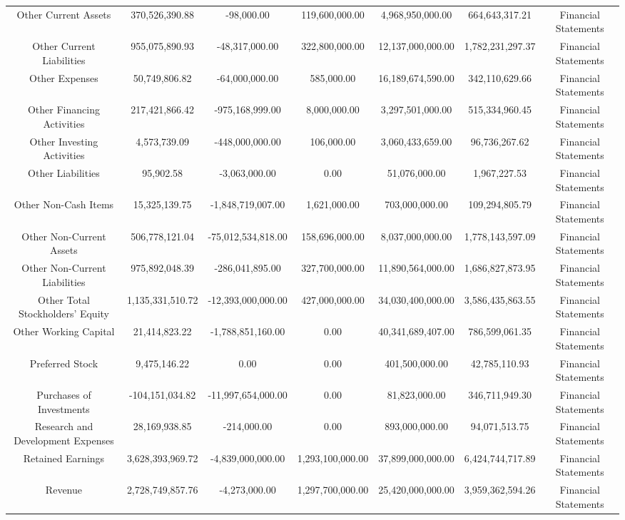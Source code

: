 \begin{longtable}{ccccccc}
Other Current Assets & 370,526,390.88 & -98,000.00 & 119,600,000.00 & 4,968,950,000.00 & 664,643,317.21 & Financial Statements \\
Other Current Liabilities & 955,075,890.93 & -48,317,000.00 & 322,800,000.00 & 12,137,000,000.00 & 1,782,231,297.37 & Financial Statements \\
Other Expenses & 50,749,806.82 & -64,000,000.00 & 585,000.00 & 16,189,674,590.00 & 342,110,629.66 & Financial Statements \\
Other Financing Activities & 217,421,866.42 & -975,168,999.00 & 8,000,000.00 & 3,297,501,000.00 & 515,334,960.45 & Financial Statements \\
Other Investing Activities & 4,573,739.09 & -448,000,000.00 & 106,000.00 & 3,060,433,659.00 & 96,736,267.62 & Financial Statements \\
Other Liabilities & 95,902.58 & -3,063,000.00 & 0.00 & 51,076,000.00 & 1,967,227.53 & Financial Statements \\
Other Non-Cash Items & 15,325,139.75 & -1,848,719,007.00 & 1,621,000.00 & 703,000,000.00 & 109,294,805.79 & Financial Statements \\
Other Non-Current Assets & 506,778,121.04 & -75,012,534,818.00 & 158,696,000.00 & 8,037,000,000.00 & 1,778,143,597.09 & Financial Statements \\
Other Non-Current Liabilities & 975,892,048.39 & -286,041,895.00 & 327,700,000.00 & 11,890,564,000.00 & 1,686,827,873.95 & Financial Statements \\
Other Total Stockholders' Equity & 1,135,331,510.72 & -12,393,000,000.00 & 427,000,000.00 & 34,030,400,000.00 & 3,586,435,863.55 & Financial Statements \\
Other Working Capital & 21,414,823.22 & -1,788,851,160.00 & 0.00 & 40,341,689,407.00 & 786,599,061.35 & Financial Statements \\
Preferred Stock & 9,475,146.22 & 0.00 & 0.00 & 401,500,000.00 & 42,785,110.93 & Financial Statements \\
Purchases of Investments & -104,151,034.82 & -11,997,654,000.00 & 0.00 & 81,823,000.00 & 346,711,949.30 & Financial Statements \\
Research and Development Expenses & 28,169,938.85 & -214,000.00 & 0.00 & 893,000,000.00 & 94,071,513.75 & Financial Statements \\
Retained Earnings & 3,628,393,969.72 & -4,839,000,000.00 & 1,293,100,000.00 & 37,899,000,000.00 & 6,424,744,717.89 & Financial Statements \\
Revenue & 2,728,749,857.76 & -4,273,000.00 & 1,297,700,000.00 & 25,420,000,000.00 & 3,959,362,594.26 & Financial Statements \\

\end{longtable}
